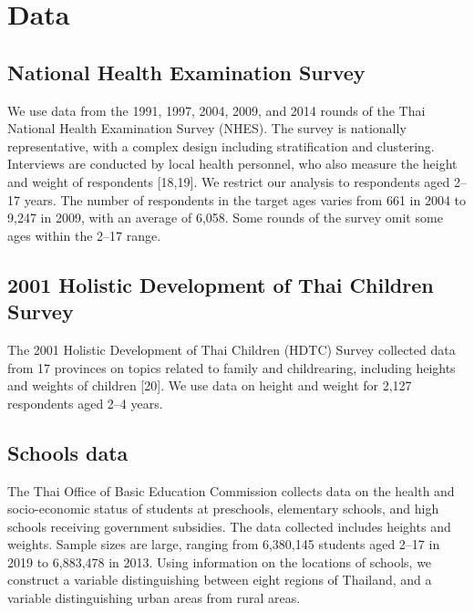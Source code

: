 \documentclass[10pt,letterpaper]{article}
\begin{document}
\hypertarget{data}{%
\section{Data}\label{data}}

\hypertarget{national-health-examination-survey}{%
\subsection{National Health Examination
Survey}\label{national-health-examination-survey}}

We use data from the 1991, 1997, 2004, 2009, and 2014 rounds of the Thai
National Health Examination Survey (NHES). The survey is nationally
representative, with a complex design including stratification and
clustering. Interviews are conducted by local health personnel, who also
measure the height and weight of respondents {[}18,19{]}. We restrict
our analysis to respondents aged 2--17 years. The number of respondents
in the target ages varies from 661 in 2004 to 9,247 in 2009, with an
average of 6,058. Some rounds of the survey omit some ages within the
2--17 range.

\hypertarget{holistic-development-of-thai-children-survey}{%
\subsection{2001 Holistic Development of Thai Children
Survey}\label{holistic-development-of-thai-children-survey}}

The 2001 Holistic Development of Thai Children (HDTC) Survey collected
data from 17 provinces on topics related to family and childrearing,
including heights and weights of children {[}20{]}. We use data on
height and weight for 2,127 respondents aged 2--4 years.

\hypertarget{subsec:schools}{%
\subsection{Schools data}\label{subsec:schools}}

The Thai Office of Basic Education Commission collects data on the
health and socio-economic status of students at preschools, elementary
schools, and high schools receiving government subsidies. The data
collected includes heights and weights. Sample sizes are large, ranging
from 6,380,145 students aged 2--17 in 2019 to 6,883,478 in 2013. Using
information on the locations of schools, we construct a variable
distinguishing between eight regions of Thailand, and a variable
distinguishing urban areas from rural areas.
\end{document}
